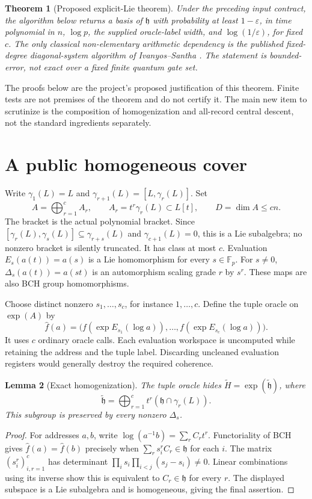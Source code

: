 \documentclass[11pt]{article}
\newtheorem{theorem}{Theorem}
\newtheorem{lemma}[theorem]{Lemma}
\theoremstyle{remark}
\newcommand{\Fp}{\mathbb F_p}
\newcommand{\eps}{\varepsilon}
\begin{document}
\begin{theorem}[Proposed explicit-Lie theorem]\label{thm:main}
Under the preceding input contract, the algorithm below returns a basis
of $\mathfrak h$ with probability at least $1-\eps$, in time polynomial
in $n$, $\log p$, the supplied oracle-label width, and $\log(1/\eps)$,
for fixed $c$. The only classical non-elementary arithmetic dependency
is the published fixed-degree diagonal-system algorithm of
Ivanyos--Santha \cite{is}. The statement is bounded-error, not exact
over a fixed finite quantum gate set.
\end{theorem}

The proofs below are the project's proposed justification of this theorem.
Finite tests are not premises of the theorem and do not certify it. The
main new item to scrutinize is the composition of homogenization and
all-record central descent, not the standard ingredients separately.

\section{A public homogeneous cover}
Write $\gamma_1(L)=L$ and $\gamma_{r+1}(L)=[L,\gamma_r(L)]$. Set
\[
 A=\bigoplus_{r=1}^{c} A_r,\qquad
 A_r=t^r\gamma_r(L)\subset L[t],\qquad
 D=\dim A\le cn.
\]
The bracket is the actual polynomial bracket. Since
$[\gamma_r(L),\gamma_s(L)]\subseteq\gamma_{r+s}(L)$ and
$\gamma_{c+1}(L)=0$, this is a Lie subalgebra; no nonzero bracket is
silently truncated. It has class at most $c$. Evaluation
$E_s(a(t))=a(s)$ is a Lie homomorphism for every $s\in\Fp$.
For $s\ne0$, $\Delta_s(a(t))=a(st)$ is an automorphism scaling
grade $r$ by $s^r$. These maps are also BCH group homomorphisms.

Choose distinct nonzero $s_1,\ldots,s_c$, for instance $1,\ldots,c$.
Define the tuple oracle on $\exp(A)$ by
\[
 \widehat f(a)=\bigl(f(\exp E_{s_1}(\log a)),\ldots,
                         f(\exp E_{s_c}(\log a))\bigr).
\]
It uses $c$ ordinary oracle calls. Each evaluation workspace is uncomputed
while retaining the address and the tuple label. Discarding uncleaned
evaluation registers would generally destroy the required coherence.

\begin{lemma}[Exact homogenization]\label{lem:homogeneous}
The tuple oracle hides $\widetilde H=\exp(\widetilde{\mathfrak h})$, where
\[
 \widetilde{\mathfrak h}
 =\bigoplus_{r=1}^{c}t^r(\mathfrak h\cap\gamma_r(L)).
\]
This subgroup is preserved by every nonzero $\Delta_s$.
\end{lemma}
\begin{proof}
For addresses $a,b$, write $\log(a^{-1}b)=\sum_r C_rt^r$.
Functoriality of BCH gives $\widehat f(a)=\widehat f(b)$ precisely when
$\sum_r s_i^r C_r\in\mathfrak h$ for each $i$.
The matrix $(s_i^r)_{i,r=1}^c$ has determinant
$\prod_i s_i\prod_{i<j}(s_j-s_i)\ne0$.
Linear combinations using its inverse show this is equivalent to
$C_r\in\mathfrak h$ for every $r$. The displayed subspace is a Lie
subalgebra and is homogeneous, giving the final assertion.
\end{proof}
\end{document}
